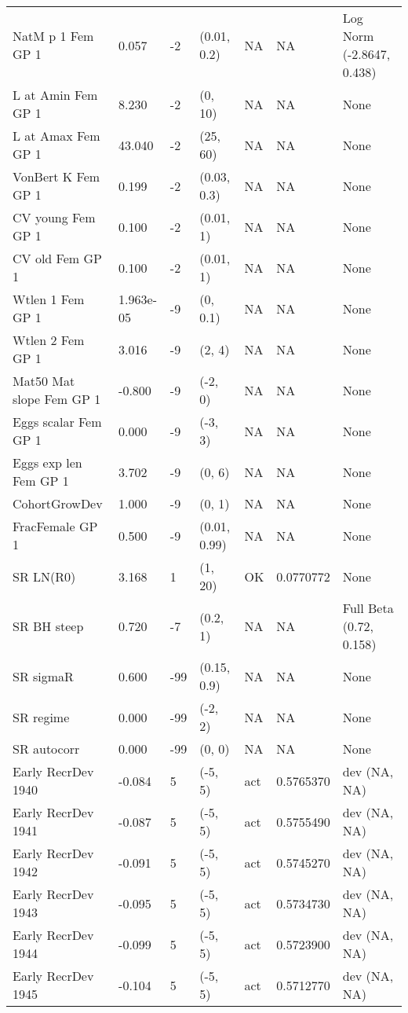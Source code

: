 \documentclass[11pt,
  english,
  a4paper,
]{article}
\begin{document}
\begin{landscape}
\begin{longtable}[t]{>{\raggedright\arraybackslash}p{6cm}lllll>{\raggedright\arraybackslash}p{4cm}}
\endfoot
\bottomrule
\endlastfoot
NatM p 1 Fem GP 1 & 0.057 & -2 & (0.01, 0.2) & NA & NA & Log Norm (-2.8647, 0.438)\\
L at Amin Fem GP 1 & 8.230 & -2 & (0, 10) & NA & NA & None\\
L at Amax Fem GP 1 & 43.040 & -2 & (25, 60) & NA & NA & None\\
VonBert K Fem GP 1 & 0.199 & -2 & (0.03, 0.3) & NA & NA & None\\
CV young Fem GP 1 & 0.100 & -2 & (0.01, 1) & NA & NA & None\\
CV old Fem GP 1 & 0.100 & -2 & (0.01, 1) & NA & NA & None\\
Wtlen 1 Fem GP 1 & 1.963e-05 & -9 & (0, 0.1) & NA & NA & None\\
Wtlen 2 Fem GP 1 & 3.016 & -9 & (2, 4) & NA & NA & None\\
Mat50%
Mat slope Fem GP 1 & -0.800 & -9 & (-2, 0) & NA & NA & None\\
Eggs scalar Fem GP 1 & 0.000 & -9 & (-3, 3) & NA & NA & None\\
Eggs exp len Fem GP 1 & 3.702 & -9 & (0, 6) & NA & NA & None\\
CohortGrowDev & 1.000 & -9 & (0, 1) & NA & NA & None\\
FracFemale GP 1 & 0.500 & -9 & (0.01, 0.99) & NA & NA & None\\
SR LN(R0) & 3.168 & 1 & (1, 20) & OK & 0.0770772 & None\\
SR BH steep & 0.720 & -7 & (0.2, 1) & NA & NA & Full Beta (0.72, 0.158)\\
SR sigmaR & 0.600 & -99 & (0.15, 0.9) & NA & NA & None\\
SR regime & 0.000 & -99 & (-2, 2) & NA & NA & None\\
SR autocorr & 0.000 & -99 & (0, 0) & NA & NA & None\\
Early RecrDev 1940 & -0.084 & 5 & (-5, 5) & act & 0.5765370 & dev (NA, NA)\\
Early RecrDev 1941 & -0.087 & 5 & (-5, 5) & act & 0.5755490 & dev (NA, NA)\\
Early RecrDev 1942 & -0.091 & 5 & (-5, 5) & act & 0.5745270 & dev (NA, NA)\\
Early RecrDev 1943 & -0.095 & 5 & (-5, 5) & act & 0.5734730 & dev (NA, NA)\\
Early RecrDev 1944 & -0.099 & 5 & (-5, 5) & act & 0.5723900 & dev (NA, NA)\\
Early RecrDev 1945 & -0.104 & 5 & (-5, 5) & act & 0.5712770 & dev (NA, NA)\\

\end{longtable}
\end{landscape}
\end{document}
